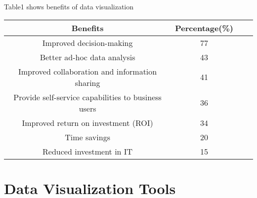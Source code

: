 \documentclass[sigconf]{acmart}
\begin{document}
Table1 shows benefits of data visualization 

\begin{center}
 \begin{tabular}{||c c c c||} 
 \hline
 Benefits & Percentage(\%) \\ [0.7ex] 
 \hline
 Improved decision-making & 77 \\ 
 \hline
 Better ad-hoc data analysis & 43  \\ 
 \hline
 Improved collaboration and information sharing & 41  \\ 
 \hline
 Provide self-service capabilities to business users & 36  \\ 
 \hline
 Improved return on investment (ROI) & 34  \\ 
 \hline
  Time savings & 20  \\ 
 \hline
  Reduced investment in IT & 15  \\ 
 \hline
\end{tabular}
\end{center}
\cite{sept1004}

\section{Data Visualization Tools}
\end{document}

